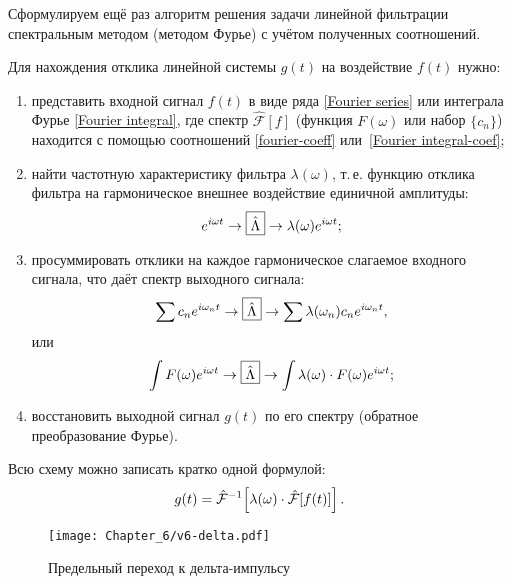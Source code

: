 Сформулируем ещё раз алгоритм решения задачи линейной фильтрации
спектральным методом (методом Фурье) с учётом полученных соотношений.

Для нахождения отклика линейной системы $g(t)$ на воздействие $f(t)$
нужно:
\begin{enumerate}
    \item представить входной сигнал $f(t)$ в виде ряда
    \eqref{Fourier series} или интеграла Фурье \eqref{Fourier integral},
где спектр $\hat{\mathcal{F}}[f]$ (функция $F(\omega)$ или набор $\{c_n\}$)
находится с помощью соотношений \eqref{fourier-coeff}
или~\eqref{Fourier integral-coef};

    \item найти частотную характеристику фильтра
$\lambda(\omega)$, т.\,е. функцию отклика фильтра на гармоническое внешнее воздействие
единичной амплитуды:
\begin{equation*}
    e^{i\omega t}\to\fbox{$\hat\Lambda$}\to \lambda(\omega)e^{i\omega t};
\end{equation*}

    \item просуммировать отклики на каждое гармоническое
    слагаемое входного сигнала, что даёт спектр выходного сигнала:
    \begin{equation*}
    \sum c_n e^{i\omega_n t} \to\fbox{$\hat\Lambda$}\to \sum \lambda(\omega_n)c_n e^{i\omega_n t},
    \end{equation*}
    или
    \begin{equation*}
    \int F(\omega) e^{i\omega t} \to\fbox{$\hat\Lambda$}\to
    \int \lambda(\omega)\cdot F(\omega)e^{i\omega t};
    \end{equation*}
    \item восстановить выходной сигнал $g(t)$ по его спектру
    (обратное преобразование Фурье).
\end{enumerate}
Всю схему можно записать кратко одной формулой:
    \begin{equation}
        \eqmark{linear-filter-fourier}
    g(t) = \hat{\mathcal{F}}^{-1}\!
    \left[\lambda(\omega)\cdot \hat{\mathcal{F}}[f(t)]\right].
    \end{equation}


\begin{wrapfigure}[15]{o}{0.22\textwidth}
     \centering\texttt{[image: Chapter\_6/v6-delta.pdf]}
     \caption{\footnotesize Предельный переход к дельта-импульсу}
\end{wrapfigure}

